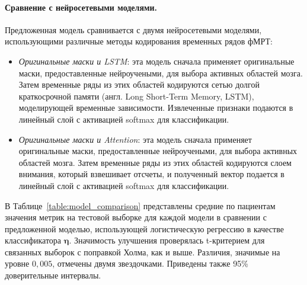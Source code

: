 \paragraph{Сравнение с нейросетевыми моделями.}\label{sec4:cls_nn} Предложенная модель сравнивается с двумя нейросетевыми моделями, использующими различные методы кодирования временных рядов фМРТ:
\begin{itemize}
    \item \textit{Оригинальные маски и LSTM}: эта модель сначала применяет оригинальные маски, предоставленные нейроучеными, для выбора активных областей мозга. Затем временные ряды из этих областей кодируются сетью долгой краткосрочной памяти (англ. Long Short-Term Memory, LSTM), моделирующей временные зависимости. Извлеченные признаки подаются в линейный слой с активацией softmax для классификации.
    \item \textit{Оригинальные маски и Attention}: эта модель сначала применяет оригинальные маски, предоставленные нейроучеными, для выбора активных областей мозга. Затем временные ряды из этих областей кодируются слоем внимания, который взвешивает отсчеты, и полученный вектор подается в линейный слой с активацией softmax для классификации.
\end{itemize}

В Таблице~\ref{table:model_comparison} представлены средние по пациентам значения метрик на тестовой выборке для каждой модели в сравнении с предложенной моделью, использующей логистическую регрессию в качестве классификатора $\boldsymbol{\eta}$. Значимость улучшения проверялась t-критерием для связанных выборок с поправкой Холма, как и выше. Различия, значимые на уровне $0{,}005$, отмечены двумя звездочками. Приведены также 95\% доверительные интервалы.

\begin{table}[h!]
    \centering
    \caption{Сравнение модели с подходами на основе нейронных сетей. Метрики на тестовой выборке усреднены по пациентам и приведены с доверительными интервалами. Двумя звездочками отмечены отличия, значимые на уровне $0{,}005$}\label{table:model_comparison}
\end{table}

